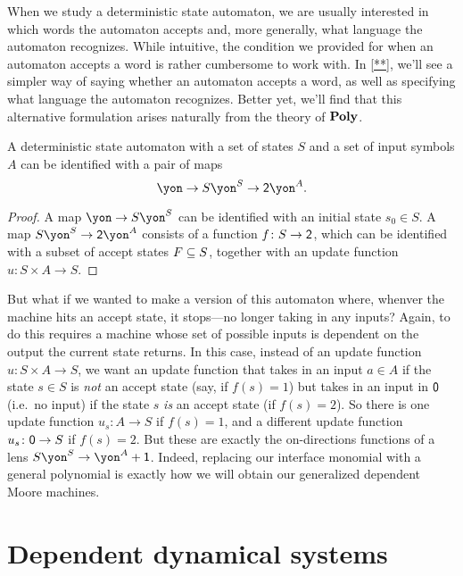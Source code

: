 \documentclass[Book-Poly]{subfiles}
\begin{document}
\begin{remark}
When we study a deterministic state automaton, we are usually interested in which words the automaton accepts and, more generally, what language the automaton recognizes.
While intuitive, the condition we provided for when an automaton accepts a word is rather cumbersome to work with.
In \cref{**}, we'll see a simpler way of saying whether an automaton accepts a word, as well as specifying what language the automaton recognizes.
Better yet, we'll find that this alternative formulation arises naturally from the theory of $\poly$.
\end{remark}

\begin{proposition}
A deterministic state automaton with a set of states $S$ and a set of input symbols $A$ can be identified with a pair of maps
\[
\yon\to S\yon^S\to \2\yon^A.
\]
\end{proposition}
\begin{proof}
A map $\yon\to S\yon^S$ can be identified with an initial state $s_0\in S$.
A map $S\yon^S\to\2\yon^A$ consists of a function $f\colon S\to\2$, which can be identified with a subset of accept states $F \ss S$, together with an update function $u \colon S\times A\to S$.
\end{proof}

But what if we wanted to make a version of this automaton where, whenver the machine hits an accept state, it stops---no longer taking in any inputs? Again, to do this requires a machine whose set of possible inputs is dependent on the output the current state returns.
In this case, instead of an update function $u\colon S\times A\to S$, we want an update function that takes in an input $a\in A$ if the state $s\in S$ is \emph{not} an accept state (say, if $f(s)=1$) but takes in an input in $\0$ (i.e.\ no input) if the state $s$ \emph{is} an accept state (if $f(s)=2$).
So there is one update function $u_s\colon A\to S$ if $f(s)=1$, and a different update function $u_s\colon\0\to S$ if $f(s)=2$.
But these are exactly the on-directions functions of a lens $S\yon^S\to\yon^A+\1$.
Indeed, replacing our interface monomial with a general polynomial is exactly how we will obtain our generalized dependent Moore machines.

\section{Dependent dynamical systems}\label{sec.poly.dyn_sys.depend_sys}
\end{document}
